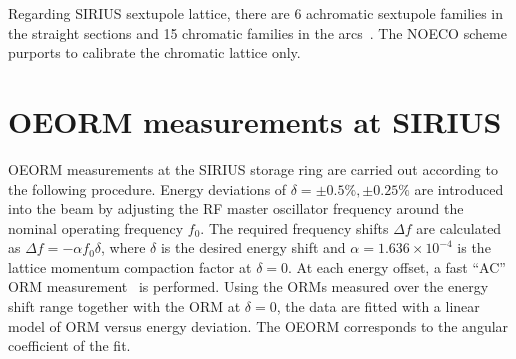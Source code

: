 \documentclass[%
               ]{jacow}
\begin{document}
Regarding SIRIUS sextupole lattice, there are 6 achromatic sextupole families in the straight sections
and 15 chromatic families in the arcs~\cite{Liu:IPAC16-THPMR013}.
The NOECO scheme purports to calibrate the chromatic lattice only.

\section{OEORM measurements at SIRIUS}

OEORM measurements at the SIRIUS storage ring are carried out according to the following procedure. Energy deviations of $\delta=\pm 0.5 \%, \pm 0.25 \%$ are introduced into the beam by adjusting the RF master oscillator frequency around the nominal operating frequency $f_0$. The required frequency shifts $\Delta f$ are calculated as $\Delta f = -\alpha f_0 \delta$, where $\delta$ is the desired energy shift and $\alpha = 1.636\times10^{-4}$ is the lattice momentum compaction factor at $\delta=0$. At each energy offset, a fast ``AC'' ORM measurement~\cite{velloso:ipac2022-mopotk002} is performed. Using the ORMs measured over the energy shift range together with the ORM at $\delta=0$, the data are fitted with a linear model of ORM versus energy deviation. The OEORM corresponds to the angular coefficient of the fit.
\end{document}
